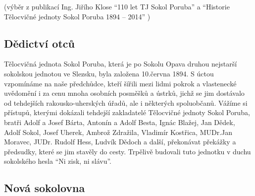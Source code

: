 \documentclass[openany]{report}
\begin{document}
(výběr z publikací Ing. Jiřího Klose \enquote{110 let TJ Sokol Poruba} a \enquote{Historie Tělocvičné jednoty Sokol Poruba 1894 – 2014} )

\subsection{Dědictví otců}

Tělocvičná jednota Sokol Poruba, která je po Sokolu Opava druhou nejstarší sokolskou jednotou ve Slezsku, byla založena 10.června 1894. S úctou vzpomínáme na naše předchůdce, kteří šířili mezi lidmi pokrok a vlastenecké uvědomění i za cenu mnoha osobních posměšků a  ústrků, jichž se jim dostávalo od tehdejších rakousko-uherských úřadů, ale i některých spoluobčanů. Vážíme si přístupů, kterými dokázali tehdejší zakladatelé Tělocvičné jednoty Sokol Poruba, bratři Adolf a Josef Bárta, Antonín a Adolf Besta, Ignác Blažej, Jan Dědek, Adolf Sokol, Josef Uherek, Ambrož Zdražila, Vladimír Kostřica, MUDr.Jan Moravec, JUDr. Rudolf Hess, Ludvík Dědoch a další, překonávat překážky a předsudky, které se jim stavěly do cesty. Trpělivě budovali tuto jednotku v duchu
sokolského hesla \enquote{Ni zisk, ni slávu}.

\subsection{Nová sokolovna}
\end{document}
